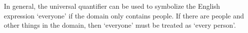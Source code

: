 In general, the universal quantifier can be used to symbolize the English expression `everyone' if the domain only contains people. If there are people and other things in the domain, then `everyone' must be treated as `every person'.
%
%
%
%
%
